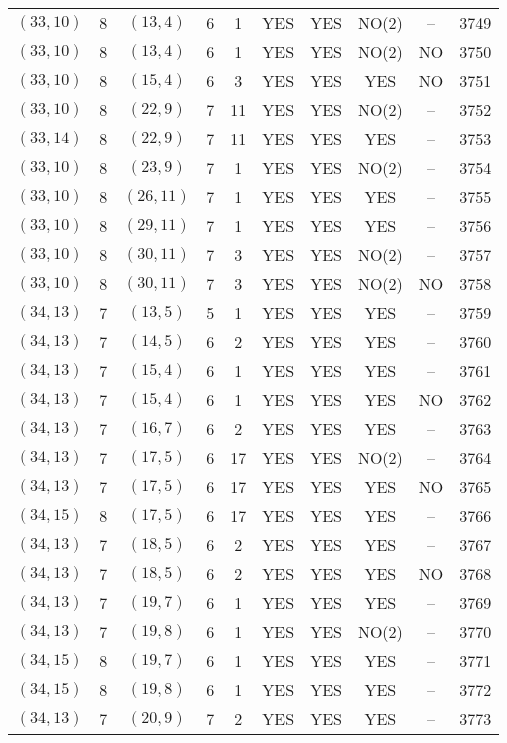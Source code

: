 \begin{longtable}{|c|c|c|c|c|c|c|c|c|c|}
$(33, 10)$ & 8 & $(13, 4)$ & 6 & 1 & YES & YES & NO(2) & -- & 3749\\
$(33, 10)$ & 8 & $(13, 4)$ & 6 & 1 & YES & YES & NO(2) & NO & 3750\\
$(33, 10)$ & 8 & $(15, 4)$ & 6 & 3 & YES & YES & YES & NO & 3751\\
$(33, 10)$ & 8 & $(22, 9)$ & 7 & 11 & YES & YES & NO(2) & -- & 3752\\
$(33, 14)$ & 8 & $(22, 9)$ & 7 & 11 & YES & YES & YES & -- & 3753\\
$(33, 10)$ & 8 & $(23, 9)$ & 7 & 1 & YES & YES & NO(2) & -- & 3754\\
$(33, 10)$ & 8 & $(26, 11)$ & 7 & 1 & YES & YES & YES & -- & 3755\\
$(33, 10)$ & 8 & $(29, 11)$ & 7 & 1 & YES & YES & YES & -- & 3756\\
$(33, 10)$ & 8 & $(30, 11)$ & 7 & 3 & YES & YES & NO(2) & -- & 3757\\
$(33, 10)$ & 8 & $(30, 11)$ & 7 & 3 & YES & YES & NO(2) & NO & 3758\\
$(34, 13)$ & 7 & $(13, 5)$ & 5 & 1 & YES & YES & YES & -- & 3759\\
$(34, 13)$ & 7 & $(14, 5)$ & 6 & 2 & YES & YES & YES & -- & 3760\\
$(34, 13)$ & 7 & $(15, 4)$ & 6 & 1 & YES & YES & YES & -- & 3761\\
$(34, 13)$ & 7 & $(15, 4)$ & 6 & 1 & YES & YES & YES & NO & 3762\\
$(34, 13)$ & 7 & $(16, 7)$ & 6 & 2 & YES & YES & YES & -- & 3763\\
$(34, 13)$ & 7 & $(17, 5)$ & 6 & 17 & YES & YES & NO(2) & -- & 3764\\
$(34, 13)$ & 7 & $(17, 5)$ & 6 & 17 & YES & YES & YES & NO & 3765\\
$(34, 15)$ & 8 & $(17, 5)$ & 6 & 17 & YES & YES & YES & -- & 3766\\
$(34, 13)$ & 7 & $(18, 5)$ & 6 & 2 & YES & YES & YES & -- & 3767\\
$(34, 13)$ & 7 & $(18, 5)$ & 6 & 2 & YES & YES & YES & NO & 3768\\
$(34, 13)$ & 7 & $(19, 7)$ & 6 & 1 & YES & YES & YES & -- & 3769\\
$(34, 13)$ & 7 & $(19, 8)$ & 6 & 1 & YES & YES & NO(2) & -- & 3770\\
$(34, 15)$ & 8 & $(19, 7)$ & 6 & 1 & YES & YES & YES & -- & 3771\\
$(34, 15)$ & 8 & $(19, 8)$ & 6 & 1 & YES & YES & YES & -- & 3772\\
$(34, 13)$ & 7 & $(20, 9)$ & 7 & 2 & YES & YES & YES & -- & 3773\\

\end{longtable}
